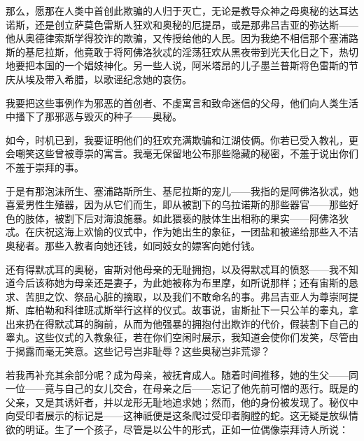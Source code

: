 那么，愿那在人类中首创此欺骗的人归于灭亡，无论是教导众神之母奥秘的达耳达诺斯，还是创立萨莫色雷斯人狂欢和奥秘的厄提昂，或是那弗吕吉亚的弥达斯——他从奥德律索斯学得狡诈的欺骗，又传授给他的人民。因为我绝不相信那个塞浦路斯的基尼拉斯，他竟敢于将阿佛洛狄忒的淫荡狂欢从黑夜带到光天化日之下，热切地要把本国的一个娼妓神化。另一些人说，阿米塔昂的儿子墨兰普斯将色雷斯的节庆从埃及带入希腊，以歌谣纪念她的哀伤。\par

我要把这些事例作为邪恶的首创者、不虔寓言和致命迷信的父母，他们向人类生活中播下了那邪恶与毁灭的种子——奥秘。\par

如今，时机已到，我要证明他们的狂欢充满欺骗和江湖伎俩。你若已受入教礼，更会嘲笑这些曾被尊崇的寓言。我毫无保留地公布那些隐藏的秘密，不羞于说出你们不羞于崇拜的事。\par

于是有那泡沫所生、塞浦路斯所生、基尼拉斯的宠儿——我指的是阿佛洛狄忒，她喜爱男性生殖器，因为从它们而生，即从被割下的乌拉诺斯的那些器官——那些好色的肢体，被割下后对海浪施暴。如此猥亵的肢体生出相称的果实——阿佛洛狄忒。在庆祝这海上欢愉的仪式中，作为她出生的象征，一团盐和被递给那些入不洁奥秘者。那些入教者向她还钱，如同妓女的嫖客向她付钱。\par

还有得默忒耳的奥秘，宙斯对他母亲的无耻拥抱，以及得默忒耳的愤怒——我不知道今后该称她为母亲还是妻子，为此她被称为布里摩，如所说那样；还有宙斯的恳求、苦胆之饮、祭品心脏的摘取，以及我们不敢命名的事。弗吕吉亚人为尊崇阿提斯、库柏勒和科律班忒斯举行这样的仪式。故事说，宙斯扯下一只公羊的睾丸，拿出来扔在得默忒耳的胸前，从而为他强暴的拥抱付出欺诈的代价，假装割下自己的睾丸。这些仪式的入教象征，若在你们空闲时展示，我知道会使你们发笑，尽管由于揭露而毫无笑意。这些记号岂非耻辱？这些奥秘岂非荒谬？\par

若我再补充其余部分呢？成为母亲，被抚育成人。随着时间推移，她的生父——同一位——竟与自己的女儿交合，在母亲之后——忘记了他先前可憎的恶行。既是的父亲，又是其诱奸者，并以龙形无耻地追求她；然而，他的身份被发现了。秘仪中向受印者展示的标记是——这神祇便是这条爬过受印者胸膛的蛇。这无疑是放纵情欲的明证。生了一个孩子，尽管是以公牛的形式，正如一位偶像崇拜诗人所说：\par

